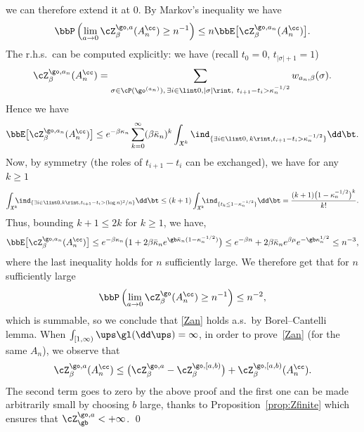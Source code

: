we can therefore extend it at $0$.
By Markov's inequality we have
\begin{equation}
\bbP\left(\lim_{a\to 0}\cZ^{\go, a}_{\beta}(A^{\cc}_{n})\ge n^{-1} \right) \le n \bbE \bigl[ \cZ^{\go,a_n}_{\beta}(A^{\cc}_{n}) \bigr].
\end{equation}
The r.h.s.\ can be computed explicitly: we have (recall $t_0=0$, $t_{|\sigma|+1}=1$)
\begin{equation*}
\cZ^{\go,a_n}_{\beta}(A^{\cc}_{n})= \sum_{\sigma \in \cP(\go^{(a_n)}),\, \exists i\in \lint 0, |\sigma|\rint, \ t_{i+1}-t_{i}> \kappa_n^{-1/2} } w_{a_n,\beta}(\sigma).
\end{equation*}
Hence we have
\begin{equation*}
\bbE \bigl[\cZ^{\go,a_n}_{\beta}(A^{\cc}_{n})\bigr]
\le e^{-\beta \kappa_{n}}\sum_{k=0}^{\infty} (\beta \bar \kappa_n)^k \int_{ \mathfrak{X}^k} \ind_{\{ \exists i\in \lint 0,\, k\rint, t_{i+1}-t_{i}> \kappa_n^{-1/2} \}} \dd \bt.
\end{equation*}
Now, by symmetry (the roles of $t_{i+1}-t_i$ can be exchanged), we have for any $k\ge 1$
\begin{equation*}
\int_{ \mathfrak{X}^k} \hspace*{-2mm}\ind_{\{ \exists i\in \lint 0, k\rint, t_{i+1}-t_{i}> (\log n)^2/n \}} \dd \bt \le (k+1) \int_{ \mathfrak{X}^k} \hspace*{-2mm}\ind_{\{ t_k\le 1- \kappa_n^{-1/2} \}} \dd \bt = \frac{ (k+1) \bigl(1- \kappa_n^{-1/2} \bigr)^k}{k!}.
\end{equation*}
Thus, bounding $k+1\leq 2 k$ for $k\geq 1$, we have,
\[
\bbE \bigl[\cZ^{\go,a_n}_{\beta}(A^{\cc}_{n})\bigr]
\le
e^{-\beta \kappa_{n}} \bigl(1+ 2\beta \bar \kappa_n e^{\gb \bar \kappa_n (1- \kappa_n^{-1/2}) } \bigr)
\le e^{-\beta n}+ 2\beta \bar \kappa_n e^{\beta \mu} e^{ -\gb \kappa_n^{1/2} }
\le n^{-3},
\]
where the last inequality holds for $n$ sufficiently large.
We therefore get that for $n$ sufficiently large\vspace*{-3pt}
\begin{equation}
\bbP\left(\lim_{a\to 0}\cZ^{\go}_{\beta}(A^{\cc}_{n})\ge n^{-1} \right) \le n^{-2},
\end{equation}
which is summable, so we conclude that \eqref{Zan} holds a.s.\ by Borel--Cantelli lemma.
When $\int_{[1,\infty)}\ups \gl (\dd \ups) =\infty$, in order to prove~\eqref{Zan} (for the same $A_n$),
we observe that\vspace*{-3pt}
\begin{equation}
\cZ^{\go,a}_{\beta}(A^{\cc}_{n})\le \bigl(\cZ^{\go,a}_{\beta}- \cZ^{\go,[a,b)}_{\beta} \bigr) + \cZ^{\go,[a,b)}_{\beta}(A^{\cc}_{n}).
\end{equation}
The second term goes to zero by the above proof and the first one can be made arbitrarily small by choosing $b$ large, thanks to Proposition~\ref{prop:Zfinite} which ensures that $\cZ_{\gb}^{\go,a}<+\infty$.
\qed

